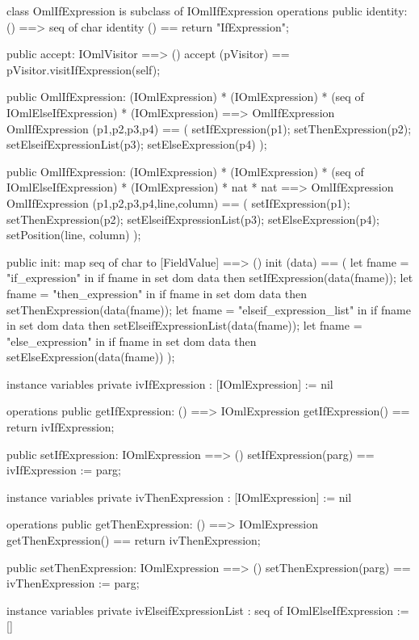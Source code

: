 \begin{vdm_al}
class OmlIfExpression is subclass of IOmlIfExpression
operations
  public identity: () ==> seq of char
  identity () == return "IfExpression";

  public accept: IOmlVisitor ==> ()
  accept (pVisitor) == pVisitor.visitIfExpression(self);

  public OmlIfExpression:
    (IOmlExpression) *
    (IOmlExpression) *
    (seq of IOmlElseIfExpression) *
    (IOmlExpression) ==> OmlIfExpression
  OmlIfExpression (p1,p2,p3,p4) == 
    ( setIfExpression(p1);
      setThenExpression(p2);
      setElseifExpressionList(p3);
      setElseExpression(p4) );

  public OmlIfExpression:
    (IOmlExpression) *
    (IOmlExpression) *
    (seq of IOmlElseIfExpression) *
    (IOmlExpression) *
    nat *
    nat ==> OmlIfExpression
  OmlIfExpression (p1,p2,p3,p4,line,column) == 
    ( setIfExpression(p1);
      setThenExpression(p2);
      setElseifExpressionList(p3);
      setElseExpression(p4);
      setPosition(line, column) );

  public init: map seq of char to [FieldValue] ==> ()
  init (data) ==
    ( let fname = "if_expression" in
        if fname in set dom data
        then setIfExpression(data(fname));
      let fname = "then_expression" in
        if fname in set dom data
        then setThenExpression(data(fname));
      let fname = "elseif_expression_list" in
        if fname in set dom data
        then setElseifExpressionList(data(fname));
      let fname = "else_expression" in
        if fname in set dom data
        then setElseExpression(data(fname)) );

instance variables
  private ivIfExpression : [IOmlExpression] := nil

operations
  public getIfExpression: () ==> IOmlExpression
  getIfExpression() == return ivIfExpression;

  public setIfExpression: IOmlExpression ==> ()
  setIfExpression(parg) == ivIfExpression := parg;

instance variables
  private ivThenExpression : [IOmlExpression] := nil

operations
  public getThenExpression: () ==> IOmlExpression
  getThenExpression() == return ivThenExpression;

  public setThenExpression: IOmlExpression ==> ()
  setThenExpression(parg) == ivThenExpression := parg;

instance variables
  private ivElseifExpressionList : seq of IOmlElseIfExpression := []


\end{vdm_al}

